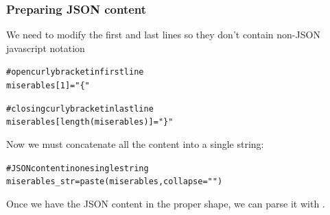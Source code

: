 \documentclass{beamer}\usepackage[]{graphicx}\usepackage[]{color}
\makeatletter
\newcommand{\hlnum}[1]{\textcolor[rgb]{0.063,0.58,0.627}{#1}}%
\newcommand{\hlstr}[1]{\textcolor[rgb]{0.063,0.58,0.627}{#1}}%
\newcommand{\hlcom}[1]{\textcolor[rgb]{0.588,0.588,0.588}{#1}}%
\newcommand{\hlstd}[1]{\textcolor[rgb]{0.196,0.196,0.196}{#1}}%
\newcommand{\hlkwb}[1]{\textcolor[rgb]{0.627,0,0.314}{#1}}%
\newcommand{\hlkwc}[1]{\textcolor[rgb]{0,0.631,0.314}{#1}}%
\newcommand{\hlkwd}[1]{\textcolor[rgb]{0.78,0.227,0.412}{#1}}%
\newenvironment{kframe}{%
 \def\at@end@of@kframe{}%
 \ifinner\ifhmode%
  \def\at@end@of@kframe{\end{minipage}}%
  \begin{minipage}{\columnwidth}%
 \fi\fi%
 \def\FrameCommand##1{\hskip\@totalleftmargin \hskip-\fboxsep
 \colorbox{shadecolor}{##1}\hskip-\fboxsep
     \hskip-\linewidth \hskip-\@totalleftmargin \hskip\columnwidth}%
 \MakeFramed {\advance\hsize-\width
   \@totalleftmargin\z@ \linewidth\hsize
   \@setminipage}}%
 {\par\unskip\endMakeFramed%
 \at@end@of@kframe}
\newenvironment{knitrout}{}{} %
\makeatother
\begin{document}
\begin{frame}[fragile]
\frametitle{Preparing JSON content}

We need to modify the first and last lines so they don't contain non-JSON javascript notation

\begin{knitrout}\tiny
{}\color{fgcolor}\begin{kframe}
\begin{alltt}
\hlcom{# open curly bracket in first line}
\hlstd{miserables[}\hlnum{1}\hlstd{]} \hlkwb{=} \hlstr{"\{"}

\hlcom{# closing curly bracket in last line}
\hlstd{miserables[}\hlkwd{length}\hlstd{(miserables)]} \hlkwb{=} \hlstr{"\}"}
\end{alltt}
\end{kframe}
\end{knitrout}

Now we must concatenate all the content into a single string:

\begin{knitrout}\tiny
{}\color{fgcolor}\begin{kframe}
\begin{alltt}
\hlcom{# JSON content in one single string}
\hlstd{miserables_str} \hlkwb{=} \hlkwd{paste}\hlstd{(miserables,} \hlkwc{collapse} \hlstd{=} \hlstr{""}\hlstd{)}
\end{alltt}
\end{kframe}
\end{knitrout}

Once we have the JSON content in the proper shape, we can parse it with .

\end{frame}

\end{document}
